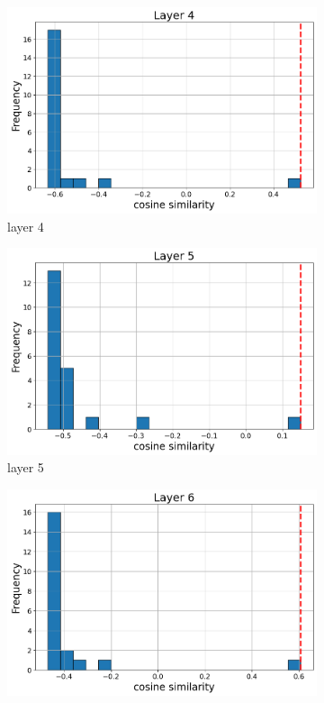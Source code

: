 \documentclass[11pt]{article}
\begin{document}
\begin{figure}[t]
  \begin{subfigure}[t]{0.24\textwidth}
    \centering
    \includegraphics[width=1.4\columnwidth]{figures/obs2_appendix/obs2_layer4.png}
    \caption{layer 4}
  \end{subfigure}\hfill
  \begin{subfigure}[t]{0.24\textwidth}
    \centering
    \includegraphics[width=1.4\columnwidth]{figures/obs2_appendix/obs2_layer5.png}
    \caption{layer 5}
  \end{subfigure}\hfill
  \begin{subfigure}[t]{0.24\textwidth}
    \centering
    \includegraphics[width=1.4\columnwidth]{figures/obs2_appendix/obs2_layer6.png}

\end{subfigure}
\end{figure}
\end{document}
